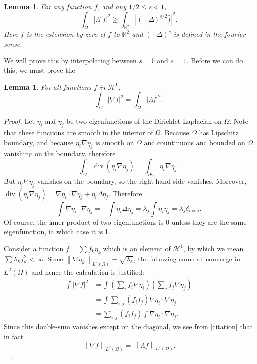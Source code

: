 \documentclass[11pt]{amsart}
\newtheorem{lemma}[theorem]{Lemma}
\theoremstyle{remark}
\theoremstyle{definition}
\newcommand{\R}{\mathbb{R}}
\newcommand{\norm}[1]{\left\lVert#1\right\rVert}
\newcommand{\paren}[1]{\left( #1 \right)}
\newcommand{\abs}[1]{\left\lvert #1 \right\rvert}
\newcommand{\del}{\partial}
\newcommand{\grad}{\nabla}
\renewcommand{\div}{\operatorname{div}}
\newcommand{\Laplace}{\Delta}
\newcommand{\eigen}[1]{\eta_{#1}} %
\newcommand{\HD}{\mathcal{H}}
\begin{document}
\begin{lemma} \label{thm:hadamard 3 lines}
For any function $f$, and any $1/2 \leq s < 1$,
\[ \int_\Omega \abs{\Lambda^s f}^2 \geq \int_{\R^2} \abs{\paren{-\Laplace}^{s/2} \bar{f}}^2. \]
Here $\bar{f}$ is the extension-by-zero of $f$ to $\R^2$ and $\paren{-\Laplace}^s$ is defined in the fourier sense.  
\end{lemma}

We will prove this by interpolating between $s = 0$ and $s=1$.  Before we can do this, we must prove the 

\begin{lemma} \label{thm:H1 and H1}
For all functions $f$ in $\HD^1$,
\[ \int_\Omega \abs{\grad f}^2 = \int_\Omega \abs{\Lambda f}^2. \]
\end{lemma}

\begin{proof}
Let $\eigen{i}$ and $\eigen{j}$ be two eigenfunctions of the Dirichlet Laplacian on $\Omega$.  Note that these functions are smooth in the interior of $\Omega$.  Because $\Omega$ has Lipschitz boundary, and because $\eigen{i} \grad \eigen{j}$ is smooth on $\Omega$ and countinuous and bounded on $\overline{\Omega}$ vanishing on the boundary, therefore 
\[ \int_\Omega \div(\eigen{i} \grad \eigen{j}) = \int_{\del \Omega} \eigen{i} \grad \eigen{j}. \]
But $\eigen{i} \grad \eigen{j}$ vanishes on the boundary, so the right hand side vanishes.  Moreover, $\div(\eigen{i} \grad \eigen{j}) = \grad \eigen{i} \cdot \grad \eigen{j} + \eigen{i} \Laplace \eigen{j}$.  Therefore
\[ \int \grad \eigen{i} \cdot \grad \eigen{j} = - \int \eigen{i} \Laplace \eigen{j} = \lambda_j \int \eigen{i} \eigen{j} = \lambda_j \delta_{i=j}. \]
Of course, the inner product of two eigenfunctions is 0 unless they are the same eigenfunction, in which case it is 1.  

Consider a function $f = \sum f_k \eigen{k}$ which is an element of $\HD^1$, by which we mean $\sum \lambda_k f_k^2 < \infty$.  Since $\norm{\grad \eigen{k}}_{L^2(\Omega)} = \sqrt{\lambda_k}$, the following sums all converge in $L^2(\Omega)$ and hence the calculation is justified:
\begin{align*}
\int \abs{\grad f}^2 &= \int \paren{\sum_i f_i \grad \eigen{i} } \paren{\sum_j f_j \grad \eigen{j}}
\\ &= \int \sum_{i,j} (f_i f_j) \grad \eigen{i} \cdot \grad \eigen{j}
\\ &= \sum_{i,j} (f_i f_j) \int \grad \eigen{i} \cdot \grad \eigen{j}.
\end{align*}
Since this double-sum vanishes except on the diagonal, we see from [citation] that in fact
\[ \norm{\grad f}_{L^2(\Omega)} = \norm{\Lambda f}_{L^2(\Omega)}. \]
\end{proof}
\end{document}
